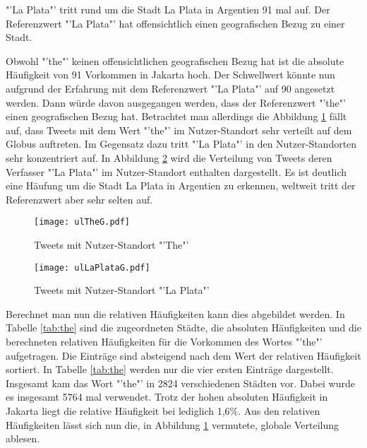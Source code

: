 				"'La Plata"' tritt rund um die Stadt La Plata in Argentien 91 mal auf.
				Der Referenzwert "'La Plata"' hat offensichtlich einen geografischen Bezug zu einer Stadt. 

				Obwohl "'the"' keinen offensichtlichen geografischen Bezug hat ist die absolute Häufigkeit von 91 Vorkommen in Jakarta hoch.
				Der Schwellwert könnte nun aufgrund der Erfahrung mit dem Referenzwert "'La Plata"' auf 90 angesetzt werden.
				Dann würde davon ausgegangen werden, dass der Referenzwert "'the"' einen geografischen Bezug hat.
				Betrachtet man allerdings die Abbildung \ref{img:ULThe} fällt auf, dass Tweets mit dem Wert "'the"' im Nutzer-Standort sehr verteilt auf dem Globus auftreten.
				Im Gegensatz dazu tritt "'La Plata"' in den Nutzer-Standorten sehr konzentriert auf.
				In Abbildung \ref{img:ULlaPlata} wird die Verteilung von Tweets deren Verfasser "'La Plata"' im Nutzer-Standort enthalten dargestellt. 
				Es ist deutlich eine Häufung um die Stadt La Plata in Argentien zu erkennen, weltweit tritt der Referenzwert aber sehr selten auf.
\begin{figure} 
					\begin{center}
						\texttt{[image: ulTheG.pdf]}
						\caption{Tweets mit Nutzer-Standort "'The"'}
						\label{img:ULThe}
					\end{center}
			\end{figure}
\begin{figure}
				\begin{center}
						\texttt{[image: ulLaPlataG.pdf]}
						\caption{Tweets mit Nutzer-Standort "'La Plata"'}
						\label{img:ULlaPlata}
					\end{center}
			\end{figure}		
				
				Berechnet man nun die relativen Häufigkeiten kann dies abgebildet werden.
				In Tabelle \ref{tab:the} sind die zugeordneten Städte, die absoluten Häufigkeiten und die berechneten relativen Häufigkeiten für die Vorkommen des Wortes "'the"' aufgetragen. 
				Die Einträge sind absteigend nach dem Wert der relativen Häufigkeit sortiert.
				In Tabelle \ref{tab:the} werden nur die vier ersten Einträge dargestellt.  
				Insgesamt kam das Wort "'the"' in 2824 verschiedenen Städten vor.
				Dabei wurde es insgesamt 5764 mal verwendet. 
				Trotz der hohen absoluten Häufigkeit in Jakarta liegt die relative Häufigkeit bei lediglich 1,6\%.
				Aus den relativen Häufigkeiten lässt sich nun die, in Abbildung \ref{img:ULThe} vermutete, globale Verteilung ablesen.


